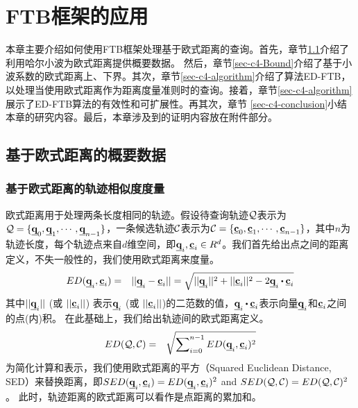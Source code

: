 \chapter{FTB框架的应用}\label{chapter:FTBED}
本章主要介绍如何使用FTB框架处理基于欧式距离的查询。首先，章节\ref{sec-c4-EDsummary}介绍了利用哈尔小波为欧式距离提供概要数据。 然后，章节\ref{sec-c4-Bound}介绍了基于小波系数的欧式距离上、下界。其次，章节\ref{sec-c4-algorithm}介绍了算法ED-FTB，以处理当使用欧式距离作为距离度量准则时的查询。接着，章节\ref{sec-c4-algorithm}展示了ED-FTB算法的有效性和可扩展性。再其次，章节 \ref{sec-c4-conclusion}小结本章的研究内容。最后，本章涉及到的证明内容放在附件部分。

\section{基于欧式距离的概要数据}\label{sec-c4-EDsummary}
\subsection{基于欧式距离的轨迹相似度度量}\label{sec-c4-ED}
欧式距离用于处理两条长度相同的轨迹。假设待查询轨迹$\cal Q$表示为${\cal Q}=\{\emph{{\textbf{q}}}_{0}, \emph{{\textbf{q}}}_{1}, \cdots, \emph{{\textbf{q}}}_{n-1}\}$，一条候选轨迹$\cal C$表示为${\cal C}=\{\emph{{\textbf{c}}}_{0}, \emph{{\textbf{c}}}_{1}, \cdots, \emph{{\textbf{c}}}_{n-1}\}$，其中$n$为轨迹长度，每个轨迹点来自$d$维空间，即$\emph{{\textbf{q}}}_{i},\emph{{\textbf{c}}}_{i} \in R^{d}$。我们首先给出点之间的距离定义，不失一般性的，我们使用欧式距离来度量。
\begin{eqnarray}
ED(\vq_{i}, \vc_{i}) & = & ||\vq_i-\vc_i|| =\sqrt{||\vq_{i}||^2+||\vc_{i}||^2- 2 \vq_{i}\bigcdot \vc_{i}}
\end{eqnarray}
其中$||\emph{{\textbf{q}}}_i||$ (或 $||\emph{{\textbf{c}}}_i||$) 表示$\emph{{\textbf{q}}}_i$ (或 $||\emph{{\textbf{c}}}_i||$)的二范数的值，$\vq_{i}\bigcdot \vc_{i}$表示向量$\emph{{\textbf{q}}}_{i}$和$\emph{{\textbf{c}}}_{i}$之间的点(内)积。
在此基础上，我们给出轨迹间的欧式距离定义。
\begin{eqnarray}
ED({\cal Q}, {\cal C}) & = & \sqrt{ \sum\nolimits_{i=0}^{n-1}ED(\emph{{\textbf{q}}}_{i},\emph{{\textbf{c}}}_{i})^{2}}
\end{eqnarray}
为简化计算和表示，我们使用欧式距离的平方（Squared Euclidean Distance, SED）来替换距离，即$SED(\emph{{\textbf{q}}}_{i}, \emph{{\textbf{c}}}_{i})=ED(\emph{{\textbf{q}}}_{i}, \emph{{\textbf{c}}}_{i})^2$ and $SED({\cal Q}, {\cal C})= ED({\cal Q}, {\cal C})^2$。
此时，轨迹距离的欧式距离可以看作是点距离的累加和。

